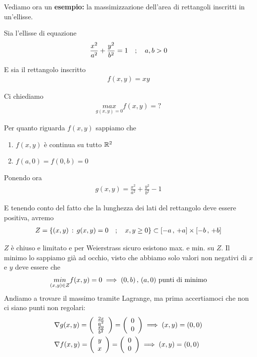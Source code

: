 \newpage

Vediamo ora un \textbf{esempio:} la massimizzazione dell'area di rettangoli inscritti in un'ellisse.

\bigskip

Sia l'ellisse di equazione
\begin{align}
	\frac{x^2}{a^2} + \frac{y^2}{b^2}=1 \quad ; \quad a,b>0
\end{align}

E sia il rettangolo inscritto
\begin{align}
	f(x,y)= xy
\end{align}

Ci chiediamo
\begin{align}
	\underset{g(x,y)=0}{max}f(x,y)=?
\end{align}

Per quanto riguarda $f(x,y)$ sappiamo che
\begin{enumerate}
	\item $f(x,y)$ è continua su tutto $\mathbb{R}^2$
	\item $f(a,0)=f(0,b)=0$ 
\end{enumerate}

Ponendo ora
\begin{align}
	g(x,y)= \frac{x^2}{a^2} + \frac{y^2}{b^2}-1
\end{align}

E tenendo conto del fatto che la lunghezza dei lati del rettangolo deve essere positiva, avremo
\begin{align}
	Z=\{ (x,y) \, : \, g(x,y)=0 \quad ; \quad x,y \geq 0 \} \subset [-a\, , \, +a]\times [-b \, , \, +b]
\end{align}

\begin{figure}[!htb]
\end{figure}

$Z$ è chiuso e limitato e per Weierstrass sicuro esistono max. e min. su $Z$. 
Il minimo lo sappiamo già ad occhio, visto che abbiamo solo valori non negativi di $x$ e $y$ deve essere che
\begin{align}
	\underset{(x,y)\in Z}{min}f(x,y)=0 \implies (0,b) \, , \, (a,0) \text{ punti di minimo}
\end{align}
Andiamo a trovare il massimo tramite Lagrange, ma prima accertiamoci che non ci siano punti non regolari:
\begin{align}
	{}&\nabla g(x,y)= \left( \begin{array}{cc} \frac{2x}{a^2} \\ \frac{2y}{b^2} \end{array} \right) = \left( \begin{array}{cc} 0 \\ 0 \end{array} \right) \implies (x,y)=(0,0)\\
	&\nabla f(x,y)=\left( \begin{array}{cc} y \\ x \end{array} \right)=  \left( \begin{array}{cc} 0 \\ 0 \end{array} \right) \implies (x,y)=(0,0)
\end{align}


